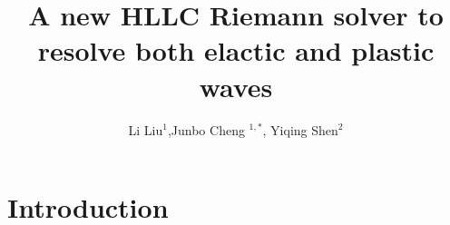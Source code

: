 \documentclass{article}
\theoremstyle{plain}\newtheorem{definition}{\sc{Definition}}
\theoremstyle{defination}\newtheorem{example}{Example}[section]
\numberwithin{equation}{section}
\numberwithin{table}{section}
\begin{document}
\title{A new HLLC Riemann solver to resolve both elactic and plastic waves}
\author{Li Liu$^1$,Junbo Cheng $^{1,*}$, Yiqing Shen$^2$}

\maketitle
\section{Introduction}
\end{document}
